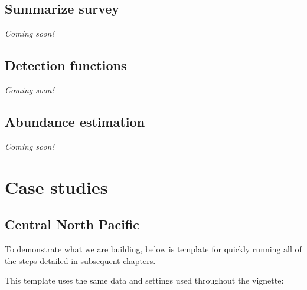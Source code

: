 \documentclass[
]{book}
\begin{document}
\hypertarget{summarize}{%
\chapter{Summarize survey}\label{summarize}}

\emph{Coming soon!}

\hypertarget{df}{%
\chapter{Detection functions}\label{df}}

\emph{Coming soon!}

\hypertarget{abundance}{%
\chapter{Abundance estimation}\label{abundance}}

\emph{Coming soon!}

\hypertarget{part-case-studies}{%
\part{Case studies}\label{part-case-studies}}

\hypertarget{casestudies}{%
\chapter{Central North Pacific}\label{casestudies}}

To demonstrate what we are building, below is template for quickly running all of the steps detailed in subsequent chapters.

This template uses the same data and settings used throughout the vignette:
\end{document}
